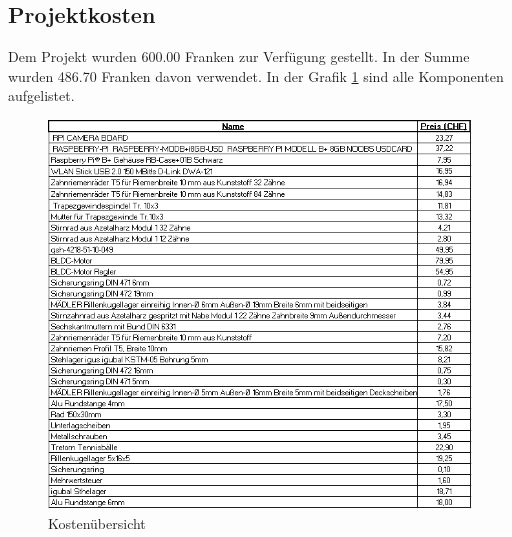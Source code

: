 \subsection{Projektkosten}
Dem Projekt wurden 600.00 Franken zur Verfügung gestellt. In der Summe wurden 486.70 Franken davon verwendet. In der Grafik \ref{fig:kostenuebersicht} sind alle Komponenten aufgelistet.

\begin{figure}[h!]
	\centering
	\includegraphics[width=\linewidth]{../../fig/Kosten}
	\caption{Kostenübersicht}
	\label{fig:kostenuebersicht}
\end{figure}
